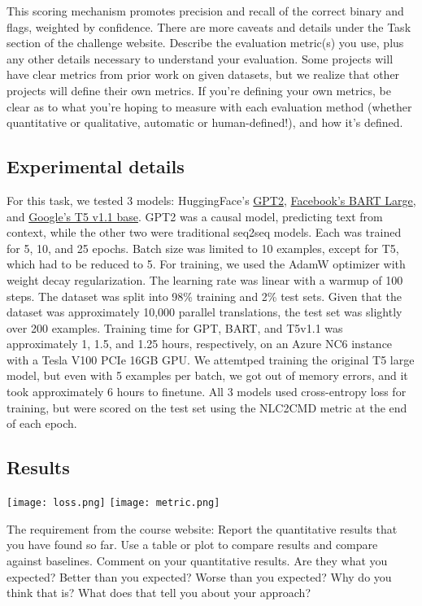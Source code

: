\documentclass{article}
\begin{document}
This scoring mechanism promotes precision and recall of the correct binary and
flags, weighted by confidence. There are more caveats and details under the
Task section of the challenge website.
Describe the evaluation metric(s) you use, plus any other details necessary to understand your evaluation.
Some projects will have clear metrics from prior work on given datasets, but we realize that other projects will define their own metrics.
If you're defining your own metrics, be clear as to what you're hoping to measure with each evaluation method (whether quantitative or qualitative, automatic or human-defined!), and how it's defined.

\color{red}
\subsection{Experimental details}
\color{black}
For this task, we tested 3 models: HuggingFace's
\href{https://huggingface.co/gpt2}{GPT2}\cite{gpt2},
\href{https://huggingface.co/facebook/bart-large}{Facebook's BART
	Large}\cite{bart}, and \href{https://huggingface.co/google/t5-v1_1-base}{Google's T5 v1.1
	base}. GPT2 was a causal model, predicting text from context, while the other
two were traditional seq2seq models. Each was trained for 5, 10, and 25
epochs. Batch size was limited to 10 examples, except for T5, which had to be
reduced to 5. For training, we used the AdamW optimizer with weight decay
regularization. The learning rate was linear with a warmup of 100 steps. The
dataset was split into 98\% training and 2\% test sets. Given that the
dataset was approximately 10,000 parallel translations, the test set was
slightly over 200 examples. Training time for GPT, BART, and T5v1.1 was
approximately 1, 1.5, and 1.25 hours, respectively, on an Azure NC6 instance
with a Tesla V100 PCIe 16GB GPU. We attemtped training the original T5 large
model, but even with 5 examples per batch, we got out of memory errors, and
it took approximately 6 hours to finetune. All 3 models used cross-entropy
loss for training, but were scored on the test set using the NLC2CMD metric
at the end of each epoch.

\color{red}
\subsection{Results}
\color{black}

\begin{center}
	\texttt{[image: loss.png]}
	\texttt{[image: metric.png]}
\end{center}
The requirement from the course website: Report the quantitative results that you have found so far. Use a table or plot to compare results and compare against baselines.
Comment on your quantitative results. Are they what you expected? Better than you expected? Worse than you expected? Why do you think that is? What does that tell you about your approach?
\end{document}

